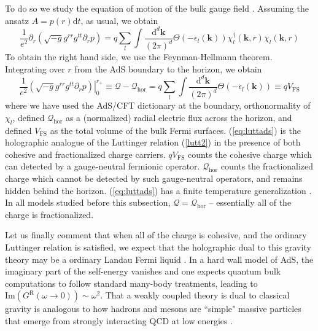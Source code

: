 \documentclass[10pt, oneside]{book}
\begin{document}
\begin{doublespace}
To do so we study the equation of motion of the bulk gauge field \cite{Sachdev:2011ze}.  Assuming the ansatz $A = p(r)\mathrm{d}t$, as usual,  we obtain \begin{equation}
\frac{1}{e^2}\partial_r \left(\sqrt{-g} g^{rr}g^{tt} \partial_r p \right)= q \sum_l  \int \frac{\mathrm{d}^d\mathbf{k}}{(2\pi)^d} \Theta(-\epsilon_l(\mathbf{k})) \chi^\dagger_l(\mathbf{k},r) \chi_l(\mathbf{k},r) 
\end{equation}
To obtain the right hand side, we use the Feynman-Hellmann theorem.  Integrating over $r$ from the AdS boundary to the horizon, we obtain \begin{equation}
\frac{1}{e^2} \left.\left(\sqrt{-g} g^{rr}g^{tt} \partial_r p \right)\right|_0^{r_+} \equiv \mathcal{Q} - \mathcal{Q}_{\mathrm{hor}} = q\sum_l  \int \frac{\mathrm{d}^d\mathbf{k}}{(2\pi)^d} \Theta(-\epsilon_l(\mathbf{k}))  \equiv q V_{\mathrm{FS}}  \label{eq:luttads}
\end{equation}
where we have used the AdS/CFT dictionary at the boundary, orthonormality of $\chi_l$,  defined $\mathcal{Q}_{\mathrm{hor}}$ as a (normalized) radial electric flux across the horizon, and defined $V_{\mathrm{FS}}$ as the total volume of the bulk Fermi surfaces.  (\ref{eq:luttads}) is the holographic analogue of the Luttinger relation (\ref{lutt2}) in the presence of both cohesive and fractionalized charge carriers.   $qV_{\mathrm{FS}}$ counts the cohesive charge which can detected by a gauge-neutral fermionic operator.  $\mathcal{Q}_{\mathrm{hor}}$ counts the fractionalized charge which cannot be detected by such gauge-neutral operators, and remains hidden behind the horizon.   (\ref{eq:luttads}) has a finite temperature generalization \cite{Sachdev:2011ze, Iqbal:2011bf}.   In all models studied before this subsection, $\mathcal{Q}=\mathcal{Q}_{\mathrm{hor}}$ -- essentially all of the charge is fractionalized.

Let us finally comment that when all of the charge is cohesive, and the ordinary Luttinger relation is satisfied, we expect that the holographic dual to this gravity theory may be a ordinary Landau Fermi liquid \cite{Sachdev:2011ze}.  In a hard wall model of AdS,  the imaginary part of the self-energy vanishes \cite{Sachdev:2011ze} and one expects quantum bulk computations to follow standard many-body treatments, leading to $\mathrm{Im}(G^{\mathrm{R}}(\omega\rightarrow0)) \sim \omega^2$.   That a weakly coupled theory is dual to classical gravity is analogous to how hadrons and mesons are ``simple" massive particles that emerge from strongly interacting QCD at low energies \cite{schalm2016}.



\end{doublespace}
\end{document}
